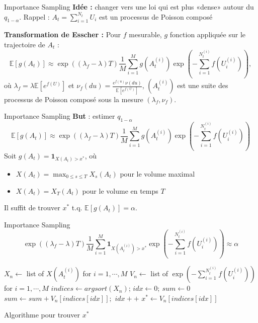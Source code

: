 \documentclass{beamer}
\def \E {\mathbb{E}}
\begin{document}
\begin{frame}{Importance Sampling}
    \textbf{Idée :} changer vers une loi qui est plus «dense» autour du $q_{1-\alpha}$.
    Rappel : $A_t=\sum_{i=1}^{N_t}U_i$ est un processus de Poisson composé

    \vspace{5pt}
    
    \textbf{Transformation de Esscher :} Pour $f$ mesurable, $g$ fonction appliquée sur le trajectoire de $A_t$ :
    \[\E[g(A_t)]\approx \exp((\lambda_f-\lambda)T) \frac{1}{M}\sum_{i=1}^M g(A_t^{(i)})\exp\left(-\sum_{i=1}^{N_t^{(i)}}f(U_i^{(i)})\right),\]
    où $\lambda_f = \lambda \E[e^{f(U)}]$ et $\displaystyle \nu_f(du)=\frac{e^{f(u)}\nu(du)}{\E[e^{f(U)}]}$, $(A_t^{(i)})$ est une suite des processus de Poisson composé sous la mesure $(\lambda_f,\nu_f)$.
\end{frame}

\begin{frame}{Importance Sampling}
    \textbf{But} : estimer $q_{1-\alpha}$
    \[\E[g(A_t)]\approx \exp((\lambda_f-\lambda)T) \frac{1}{M}\sum_{i=1}^M g(A_t^{(i)})\exp\left(-\sum_{i=1}^{N_t^{(i)}}f(U_i^{(i)})\right)\]
    Soit $g(A_t)=\mathbf{1}_{X(A_t)>x^\ast}$, où 
    \begin{itemize}
        \item $X(A_t)=\max_{0\le s\le T}X_s(A_t)$ pour le volume maximal
        \item $X(A_t)=X_T(A_t)$ pour le volume en temps $T$
    \end{itemize}
    Il suffit de trouver $x^\ast$ t.q. $\E[g(A_t)]=\alpha$.
\end{frame}

\begin{frame}{Importance Sampling}
    \[\exp((\lambda_f-\lambda)T) \frac{1}{M}\sum_{i=1}^M \mathbf{1}_{X(A_t^{(i)})>x^\ast}\exp\left(-\sum_{i=1}^{N_t^{(i)}}f(U_i^{(i)})\right)\approx\alpha \]
\begin{algorithm}[H]
\begin{algorithmic}[1]
\State $X_n\leftarrow $ list of $X(A_t^{(i)})$ for $i=1,\cdots, M$
\State $V_n\leftarrow$ list of $\exp\left(-\sum_{i=1}^{N_t^{(i)}}f(U_i^{(i)})\right)$ for $i=1,\cdots, M$
\State $indices \leftarrow argsort(X_n)$; $idx\leftarrow 0;\ sum\leftarrow 0$
\State $sum \leftarrow sum+ V_n[indices[idx]]; $ $idx ++$
\EndWhile 
\State $x^\ast\leftarrow  V_n[indices[idx]]$
\end{algorithmic}
\caption{Algorithme pour trouver $x^\ast$}
\end{algorithm}
\end{frame}
\end{document}
